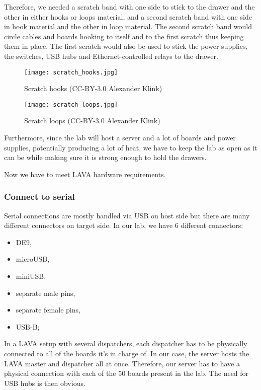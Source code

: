 Therefore, we needed a scratch band with one side to stick to the drawer and the other in either hooks or loops material, and a second scratch band with one side in hook material and the other in loop material. The second scratch band would circle cables and boards hooking to itself and to the first scratch thus keeping them in place. The first scratch would also be used to stick the power supplies, the switches, USB hubs and Ethernet-controlled relays to the drawer.

\begin{figure}[H]
  \centering
  \begin{minipage}[b]{0.45\textwidth}
    \texttt{[image: scratch\_hooks.jpg]}
    \caption{Scratch hooks (CC-BY-3.0 Alexander Klink)}
  \end{minipage}
  \hfill
  \begin{minipage}[b]{0.45\textwidth}
    \texttt{[image: scratch\_loops.jpg]}
    \caption{Scratch loops (CC-BY-3.0 Alexander Klink)}
  \end{minipage}
\end{figure}

Furthermore, since the lab will host a server and a lot of boards and power supplies, potentially producing a lot of heat, we have to keep the lab as open as it can be while making sure it is strong enough to hold the drawers.

Now we have to meet LAVA hardware requirements.

\subsubsection{Connect to serial}

Serial connections are mostly handled via USB on host side but there are many different connectors on target side. In our lab, we have 6 different connectors:
\begin{itemize}
  \item DE9,
  \item microUSB,
  \item miniUSB,
  \item separate male pins,
  \item separate female pins,
  \item USB-B;
\end{itemize}

In a LAVA setup with several dispatchers, each dispatcher has to be physically connected to all of the boards it's in charge of. In our case, the server hosts the LAVA master and dispatcher all at once. Therefore, our server has to have a physical connection with each of the 50 boards present in the lab. The need for USB hubs is then obvious.

